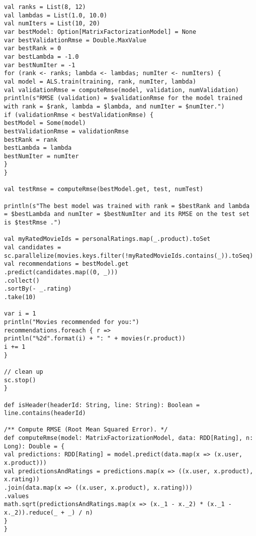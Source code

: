 \documentclass[main.tex]{thesis.tex}
\begin{document}
\begin{lstlisting}[caption=MovieLensALS.scala]
val ranks = List(8, 12)
val lambdas = List(1.0, 10.0)
val numIters = List(10, 20)
var bestModel: Option[MatrixFactorizationModel] = None
var bestValidationRmse = Double.MaxValue
var bestRank = 0
var bestLambda = -1.0
var bestNumIter = -1
for (rank <- ranks; lambda <- lambdas; numIter <- numIters) {
val model = ALS.train(training, rank, numIter, lambda)
val validationRmse = computeRmse(model, validation, numValidation)
println(s"RMSE (validation) = $validationRmse for the model trained with rank = $rank, lambda = $lambda, and numIter = $numIter.")
if (validationRmse < bestValidationRmse) {
bestModel = Some(model)
bestValidationRmse = validationRmse
bestRank = rank
bestLambda = lambda
bestNumIter = numIter
}
}

val testRmse = computeRmse(bestModel.get, test, numTest)

println(s"The best model was trained with rank = $bestRank and lambda = $bestLambda and numIter = $bestNumIter and its RMSE on the test set is $testRmse .")

val myRatedMovieIds = personalRatings.map(_.product).toSet
val candidates = sc.parallelize(movies.keys.filter(!myRatedMovieIds.contains(_)).toSeq)
val recommendations = bestModel.get
.predict(candidates.map((0, _)))
.collect()
.sortBy(- _.rating)
.take(10)

var i = 1
println("Movies recommended for you:")
recommendations.foreach { r =>
println("%2d".format(i) + ": " + movies(r.product))
i += 1
}

// clean up
sc.stop()
}

def isHeader(headerId: String, line: String): Boolean = line.contains(headerId)

/** Compute RMSE (Root Mean Squared Error). */
def computeRmse(model: MatrixFactorizationModel, data: RDD[Rating], n: Long): Double = {
val predictions: RDD[Rating] = model.predict(data.map(x => (x.user, x.product)))
val predictionsAndRatings = predictions.map(x => ((x.user, x.product), x.rating))
.join(data.map(x => ((x.user, x.product), x.rating)))
.values
math.sqrt(predictionsAndRatings.map(x => (x._1 - x._2) * (x._1 - x._2)).reduce(_ + _) / n)
}
}
\end{lstlisting}
\end{document}
